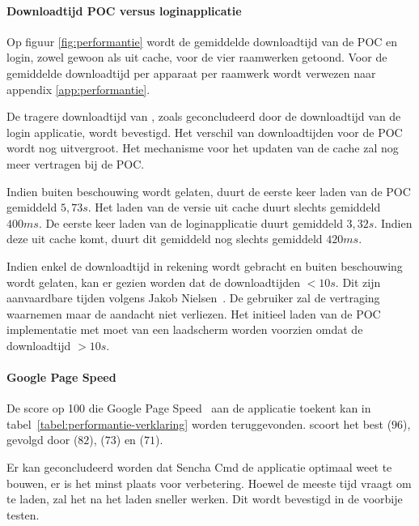 \paragraph{Downloadtijd POC versus loginapplicatie}
Op figuur \ref{fig:performantie} wordt de gemiddelde downloadtijd van de POC en login, zowel gewoon als uit cache, voor de vier raamwerken getoond.
Voor de gemiddelde downloadtijd per apparaat per raamwerk wordt verwezen naar appendix \ref{app:performantie}.


De tragere downloadtijd van \st{},  zoals geconcludeerd door de downloadtijd van de login applicatie, wordt bevestigd.
Het verschil van downloadtijden voor de POC wordt nog uitvergroot.
Het mechanisme voor het updaten van de cache zal \st{} nog meer vertragen bij de POC.

Indien \st{} buiten beschouwing wordt gelaten, duurt de eerste keer laden van de POC gemiddeld $5,73\unit{s}$. 
Het laden van de versie uit cache duurt slechts gemiddeld $400\unit{ms}$.
De eerste keer laden van de loginapplicatie duurt gemiddeld $3,32\unit{s}$.
Indien deze uit cache komt, duurt dit gemiddeld nog slechts gemiddeld $420\unit{ms}$.


Indien enkel de downloadtijd in rekening wordt gebracht en \st{} buiten beschouwing wordt gelaten, kan er gezien worden dat de downloadtijden $< 10\unit{s}$.
Dit zijn aanvaardbare tijden volgens Jakob Nielsen~\cite{Nielsen1993}.
De gebruiker zal de vertraging waarnemen maar de aandacht niet verliezen.
Het initieel laden van de POC implementatie met \st{} moet van een laadscherm worden voorzien omdat de downloadtijd $> 10\unit{s}$.


\paragraph{Google Page Speed}
De score op 100 die Google Page Speed~\cite{Morgan2011} aan de applicatie toekent kan in tabel~\ref{tabel:performantie-verklaring} worden teruggevonden.
\st{} scoort het best ($96$),  gevolgd door \lungo{} ($82$),  \kendo{}($73$) en \jqm{}($71$).

Er kan geconcludeerd worden dat Sencha Cmd de applicatie optimaal weet te bouwen,  er is het minst plaats voor verbetering.
Hoewel \st{} de meeste tijd vraagt om te laden, zal het na het laden sneller werken.
Dit wordt bevestigd in de voorbije testen.

